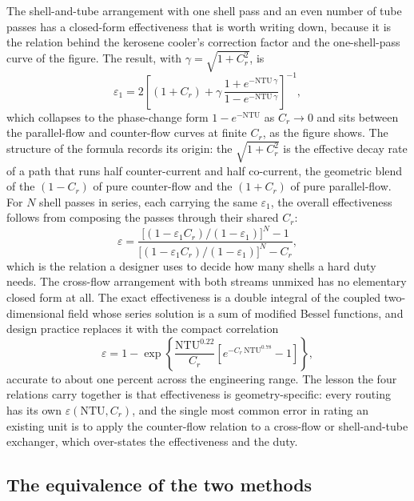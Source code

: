 The shell-and-tube arrangement with one shell pass and an even number of tube
passes has a closed-form effectiveness that is worth writing down, because it is
the relation behind the kerosene cooler's correction factor and the
one-shell-pass curve of the figure. The result, with $\gamma = \sqrt{1 + C_r^2}$,
is
\[
\varepsilon_1 = 2\left[(1 + C_r) + \gamma\,
\frac{1 + e^{-\text{NTU}\,\gamma}}{1 - e^{-\text{NTU}\,\gamma}}\right]^{-1},
\]
which collapses to the phase-change form $1 - e^{-\text{NTU}}$ as $C_r \to 0$ and
sits between the parallel-flow and counter-flow curves at finite $C_r$, as the
figure shows. The structure of the formula records its origin: the
$\sqrt{1 + C_r^2}$ is the effective decay rate of a path that runs half
counter-current and half co-current, the geometric blend of the $(1 - C_r)$ of
pure counter-flow and the $(1 + C_r)$ of pure parallel-flow. For $N$ shell passes
in series, each carrying the same $\varepsilon_1$, the overall effectiveness
follows from composing the passes through their shared $C_r$:
\[
\varepsilon = \frac{\bigl[(1 - \varepsilon_1 C_r)/(1 - \varepsilon_1)\bigr]^N - 1}
{\bigl[(1 - \varepsilon_1 C_r)/(1 - \varepsilon_1)\bigr]^N - C_r},
\]
which is the relation a designer uses to decide how many shells a hard duty needs.
The cross-flow arrangement with both streams unmixed has no elementary closed form
at all. The exact effectiveness is a double integral of the coupled
two-dimensional field whose series solution is a sum of modified Bessel functions,
and design practice replaces it with the compact correlation
\[
\varepsilon = 1 - \exp\!\left\{\frac{\text{NTU}^{0.22}}{C_r}
\left[e^{-C_r\,\text{NTU}^{0.78}} - 1\right]\right\},
\]
accurate to about one percent across the engineering range. The lesson the four
relations carry together is that effectiveness is geometry-specific: every routing
has its own $\varepsilon(\text{NTU}, C_r)$, and the single most common error in
rating an existing unit is to apply the counter-flow relation to a cross-flow or
shell-and-tube exchanger, which over-states the effectiveness and the duty.

\subsection{The equivalence of the two methods}

